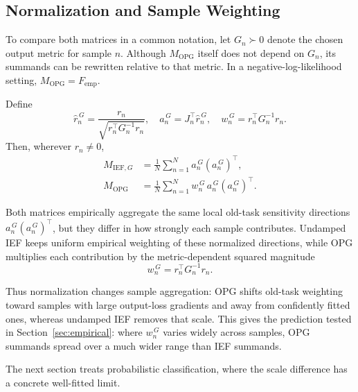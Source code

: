 \subsection{Normalization and Sample Weighting}
\label{sec:normalization-weighting}

To compare both matrices in a common notation, let $G_n\succ0$ denote the chosen output metric for sample $n$. Although $M_{\mathrm{OPG}}$ itself does not depend on $G_n$, its summands can be rewritten relative to that metric. In a negative-log-likelihood setting, $M_{\mathrm{OPG}}=F_{\mathrm{emp}}$.

Define
\[
\hat r_n^{\,G}
=
\frac{r_n}{\sqrt{r_n^\top G_n^{-1}r_n}},
\quad
a_n^{\,G}
=
J_n^\top \hat r_n^{\,G},
\quad
w_n^{\,G}
=
r_n^\top G_n^{-1}r_n.
\]
Then, wherever $r_n\ne0$,
\[
\begin{aligned}
M_{\mathrm{IEF},G}
&=
\frac{1}{N}\sum_{n=1}^N a_n^{\,G}(a_n^{\,G})^\top,
\\
M_{\mathrm{OPG}}
&=
\frac{1}{N}\sum_{n=1}^N w_n^{\,G}\,a_n^{\,G}(a_n^{\,G})^\top.
\end{aligned}
\]

Both matrices empirically aggregate the same local old-task sensitivity directions $a_n^{\,G}(a_n^{\,G})^\top$, but they differ in how strongly each sample contributes. Undamped IEF keeps uniform empirical weighting of these normalized directions, while OPG multiplies each contribution by the metric-dependent squared magnitude
\[
w_n^{\,G}=r_n^\top G_n^{-1}r_n.
\]

Thus normalization changes sample aggregation: OPG shifts old-task weighting toward samples with large output-loss gradients and away from confidently fitted ones, whereas undamped IEF removes that scale. This gives the prediction tested in Section~\ref{sec:empirical}: where $w_n^{\,G}$ varies widely across samples, OPG summands spread over a much wider range than IEF summands.

The next section treats probabilistic classification, where the scale difference has a concrete well-fitted limit.
